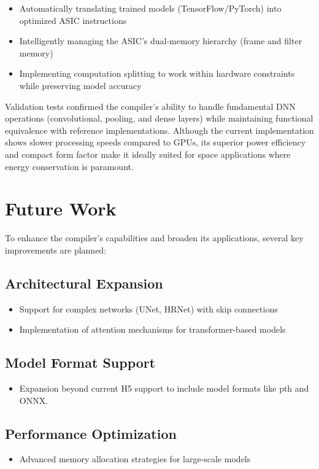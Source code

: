 \documentclass[12pt]{report}
\begin{document}
\begin{itemize}
    \item Automatically translating trained models (TensorFlow/PyTorch) into optimized ASIC instructions
    \item Intelligently managing the ASIC's dual-memory hierarchy (frame and filter memory)
    \item Implementing computation splitting to work within hardware constraints while preserving model accuracy
\end{itemize}

Validation tests confirmed the compiler's ability to handle fundamental DNN operations (convolutional, pooling, and dense layers) while maintaining functional equivalence with reference implementations. Although the current implementation shows slower processing speeds compared to GPUs, its superior power efficiency and compact form factor make it ideally suited for space applications where energy conservation is paramount.

\section{Future Work}
To enhance the compiler's capabilities and broaden its applications, several key improvements are planned:

\subsection{Architectural Expansion}
\begin{itemize}
    \item Support for complex networks (UNet, HRNet) with skip connections
    \item Implementation of attention mechanisms for transformer-based models
\end{itemize}


\subsection{Model Format Support}
\begin{itemize}
    \item Expansion beyond current H5 support to include model formats like pth and ONNX.
\end{itemize}

\subsection{Performance Optimization}
\begin{itemize}
    \item Advanced memory allocation strategies for large-scale models
\end{itemize}
\end{document}
